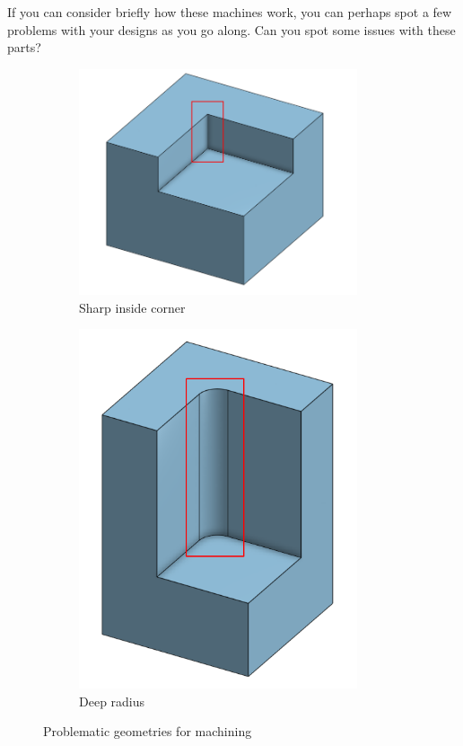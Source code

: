 If you can consider briefly how these machines work, you can perhaps spot a few problems with your designs as you go along. Can you spot some issues with these parts?
 
\begin{figure}[H]
	\centering
	\begin{subfigure}[b]{.24\linewidth}
		\includegraphics[width=0.9\textwidth]{imgs/nonmill_sharpins.png}
		\caption{Sharp inside corner}
	\end{subfigure}	\begin{subfigure}[b]{.24\linewidth}
		\includegraphics[width=0.9\textwidth]{imgs/nonmill_dtod.png}
		\caption{Deep radius}
	\end{subfigure}	
	
	\caption{Problematic geometries for machining}
\end{figure}

